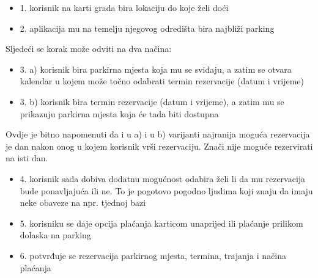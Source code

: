 	 \hspace{1cm}{\Large 	Prilikom prve registracije potrebno je potvrditi svoje podatke preko poruke poslane na prethodno unesenu e-mail adresu. Za prijavu su potrebni samo korisničko ime i lozinka. Najvažnija dodatna mogućnost koju aplikacija nudi prijavljenim korisnicima je pregled dostupnih parkirnih mjesta u realnom vremenu. Puni postupak rezervacije parkirnog mjesta izgleda ovako:}
	\begin{itemize}
		\item[] {\Large 1. korisnik na karti grada bira lokaciju do koje želi doći}
		\item[] {\Large 2. aplikacija mu na temelju njegovog odredišta bira najbliži parking}
	\end{itemize}
	{\Large Sljedeći se korak može odviti na dva načina:}
	\begin{itemize}
		\item[] {\Large 3. a) korisnik bira parkirna mjesta koja mu se sviđaju, a zatim se otvara kalendar u kojem može točno odabrati termin rezervacije (datum i vrijeme)}
		\item[] {\Large 3. b) korisnik bira termin rezervacije (datum i vrijeme), a zatim mu se prikazuju parkirna mjesta koja će tada biti dostupna}
	\end{itemize}
	{\Large Ovdje je bitno napomenuti da i u a) i u b) varijanti najranija moguća rezervacija je dan nakon onog u kojem korisnik vrši rezervaciju. Znači nije moguće rezervirati na isti dan.}
	\begin{itemize}
		\item[] {\Large 4. korisnik sada dobiva dodatnu mogućnost odabira želi li da mu rezervacija bude ponavljajuća ili ne. To je pogotovo pogodno ljudima koji znaju da imaju neke obaveze na npr. tjednoj bazi}
		\item[] {\Large 5. korisniku se daje opcija plaćanja karticom unaprijed ili plaćanje prilikom dolaska na parking}
		\item[] {\Large 6. potvrđuje se rezervacija parkirnog mjesta, termina, trajanja i načina plaćanja\\ \\ }
	\end{itemize}
	

	\hspace{1cm}{\Large Korisniku se pruža mogućnost plaćanja direktnim prijenosom sredstava s kartice ili uplaćivanjem novca u novčanik unutar aplikacije nakon kojeg se sredstva mogu koristiti u bilo kojem trenutku. Drugi način štedi vrijeme jer nije potrebno unositi podatke o kartici i vršiti potvrde prilikom svake transakcije.\\ }
	
